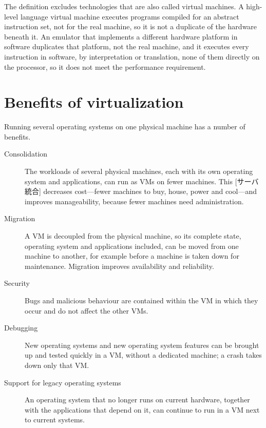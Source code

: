 \documentclass[../main.tex]{subfiles}
\begin{document}
\begin{note}
  The definition excludes technologies that are also called virtual
  machines.  A high-level language virtual machine executes programs
  compiled for an abstract instruction set, not for the real machine, so
  it is not a duplicate of the hardware beneath it.  An emulator that
  implements a different hardware platform in software duplicates that
  platform, not the real machine, and it executes every instruction in
  software, by interpretation or translation, none of them directly on
  the processor, so it does not meet the performance requirement.
\end{note}

\section{Benefits of virtualization}
\label{sec:l12-benefits}

Running several operating systems on one physical machine has a number of
benefits.
\begin{description}
  \item[Consolidation] The workloads of several physical machines, each
    with its own operating system and applications, can run as VMs on fewer
    machines.  This [サーバ統合] decreases cost---fewer
    machines to buy, house, power and cool---and improves manageability,
    because fewer machines need administration.
  \item[Migration] A VM is decoupled from the physical machine, so its
    complete state, operating system and applications included, can be
    moved from one machine to another, for example before a machine is
    taken down for maintenance.  Migration improves availability and
    reliability.
  \item[Security] Bugs and malicious behaviour are contained within the VM
    in which they occur and do not affect the other VMs.
  \item[Debugging] New operating systems and new operating system features
    can be brought up and tested quickly in a VM, without a dedicated
    machine; a crash takes down only that VM.
  \item[Support for legacy operating systems] An operating system that no
    longer runs on current hardware, together with the applications that
    depend on it, can continue to run in a VM next to current systems.
\end{description}
\end{document}
